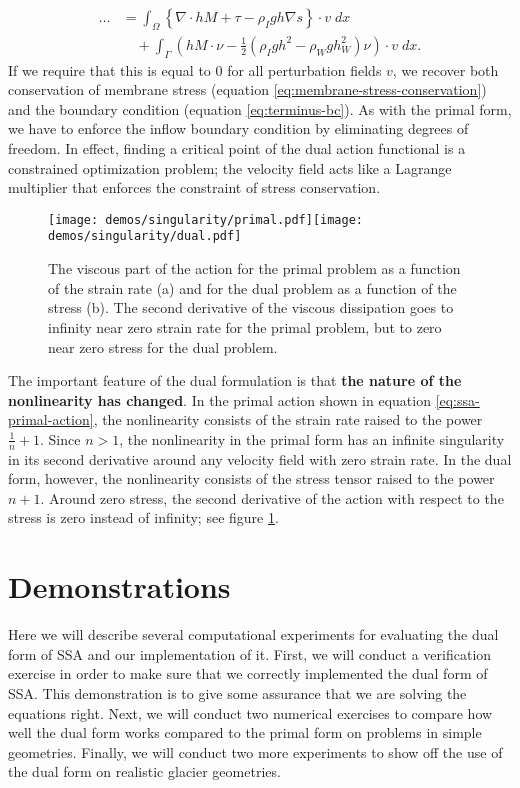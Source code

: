 \documentclass[review,oneside]{igs}
\begin{document}
\begin{align}
    \ldots & = \int_\Omega\left\{\nabla\cdot hM + \tau - \rho_Igh\nabla s\right\}\cdot v\;dx \nonumber\\
    & \quad + \int_\Gamma\left(hM\cdot\nu - \frac{1}{2}\left(\rho_Igh^2 - \rho_Wgh_W^2\right)\nu\right)\cdot v\;dx.
\end{align}
If we require that this is equal to 0 for all perturbation fields $v$, we recover both conservation of membrane stress (equation \eqref{eq:membrane-stress-conservation}) and the boundary condition (equation \eqref{eq:terminus-bc}).
As with the primal form, we have to enforce the inflow boundary condition by eliminating degrees of freedom.
In effect, finding a critical point of the dual action functional is a constrained optimization problem; the velocity field acts like a Lagrange multiplier that enforces the constraint of stress conservation.

\begin{figure}[h]
    \texttt{[image: demos/singularity/primal.pdf]}\texttt{[image: demos/singularity/dual.pdf]}
    \caption{The viscous part of the action for the primal problem as a function of the strain rate (a) and for the dual problem as a function of the stress (b).
    The second derivative of the viscous dissipation goes to infinity near zero strain rate for the primal problem, but to zero near zero stress for the dual problem.}
    \label{fig:primal-vs-dual}
\end{figure}

The important feature of the dual formulation is that \textbf{the nature of the nonlinearity has changed}.
In the primal action shown in equation \eqref{eq:ssa-primal-action}, the nonlinearity consists of the strain rate raised to the power $\frac{1}{n} + 1$.
Since $n > 1$, the nonlinearity in the primal form has an infinite singularity in its second derivative around any velocity field with zero strain rate.
In the dual form, however, the nonlinearity consists of the stress tensor raised to the power $n + 1$.
Around zero stress, the second derivative of the action with respect to the stress is zero instead of infinity; see figure \ref{fig:primal-vs-dual}.


\section{Demonstrations}

Here we will describe several computational experiments for evaluating the dual form of SSA and our implementation of it.
First, we will conduct a verification exercise in order to make sure that we correctly implemented the dual form of SSA.
This demonstration is to give some assurance that we are solving the equations right.
Next, we will conduct two numerical exercises to compare how well the dual form works compared to the primal form on problems in simple geometries.
Finally, we will conduct two more experiments to show off the use of the dual form on realistic glacier geometries.
\end{document}
